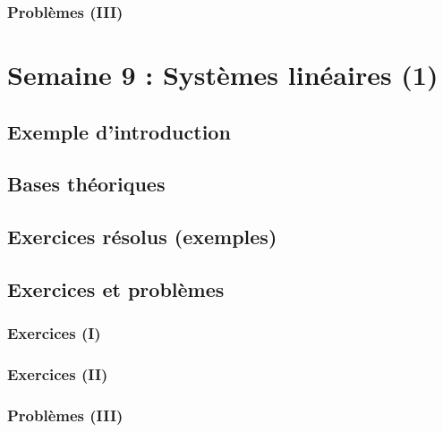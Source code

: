 \documentclass[
  12pt,
]{book}
\begin{document}
\hypertarget{probluxe8mes-iii-7}{%
\subsection{Problèmes (III)}\label{probluxe8mes-iii-7}}

\hypertarget{semaine-9-systuxe8mes-linuxe9aires-1}{%
\chapter{Semaine 9 : Systèmes linéaires (1)}\label{semaine-9-systuxe8mes-linuxe9aires-1}}

\hypertarget{exemple-dintroduction-8}{%
\section{Exemple d'introduction}\label{exemple-dintroduction-8}}

\hypertarget{bases-thuxe9oriques-8}{%
\section{Bases théoriques}\label{bases-thuxe9oriques-8}}

\hypertarget{exercices-ruxe9solus-exemples-8}{%
\section{Exercices résolus (exemples)}\label{exercices-ruxe9solus-exemples-8}}

\hypertarget{exercices-et-probluxe8mes-8}{%
\section{Exercices et problèmes}\label{exercices-et-probluxe8mes-8}}

\hypertarget{exercices-i-8}{%
\subsection{Exercices (I)}\label{exercices-i-8}}

\hypertarget{exercices-ii-8}{%
\subsection{Exercices (II)}\label{exercices-ii-8}}

\hypertarget{probluxe8mes-iii-8}{%
\subsection{Problèmes (III)}\label{probluxe8mes-iii-8}}
\end{document}
